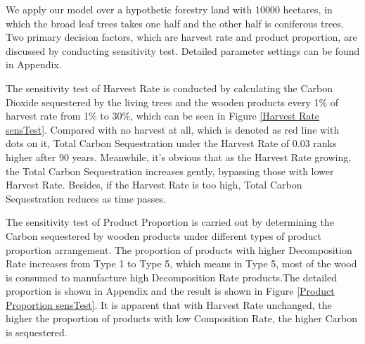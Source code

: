 \documentclass{mcmthesis}
\numberwithin{figure}{section}
\numberwithin{table}{section}
\numberwithin{equation}{section}
\begin{document}
We apply our model over a hypothetic forestry land with 10000 hectares, in which
the broad leaf trees takes one half and the other half is coniferous trees. Two
primary decision factors, which are harvest rate and product proportion,
are discussed by conducting sensitivity test. Detailed parameter settings can
be found in Appendix. 
\par
The sensitivity test of Harvest Rate is conducted by calculating the Carbon Dioxide
sequestered by the living trees and the wooden products every 1\% of 
harvest rate from 1\% to 30\%, which can be seen in Figure \ref{Harvest Rate sensTest}.
Compared with no harvest at all, which is denoted as red line with dots on it, 
Total Carbon Sequestration under the Harvest Rate of 0.03 ranks higher after 90 years.
Meanwhile, it's obvious that as the Harvest Rate growing, the Total Carbon Sequestration
increases gently, bypassing those with lower Harvest Rate. Besides, if the Harvest 
Rate is too high, Total Carbon Sequestration reduces as time passes. 
\par
The sensitivity test of Product Proportion is carried out by determining the 
Carbon sequestered by wooden products under different types of product proportion
arrangement. The proportion of products with higher Decomposition Rate increases
from Type 1 to Type 5, which means in Type 5, most of the wood is consumed to manufacture
high Decomposition Rate products.The detailed proportion is shown in 
Appendix and the result is shown in Figure \ref{Product Proportion sensTest}.
It is apparent that with Harvest Rate unchanged, the higher the proportion of
products with low Composition Rate, the higher Carbon is sequestered.
\end{document}
